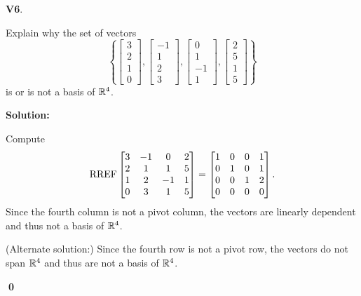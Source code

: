 \documentclass{article}
\newenvironment{problem}[1]
{
  \begin{flushleft}
  \textbf{#1}.
  \ignorespaces
}
{
  \end{flushleft}
}
\newenvironment{solution}
{
  \ignorespaces
  \textbf{Solution:}
}
{
  \ignorespacesafterend
  \begin{flushright}
  {\bfseries \qed}
  \end{flushright}
}
\begin{document}
\begin{problem}{V6}
Explain why the set of vectors \[ \left\{
 \begin{bmatrix} 3 \\ 2 \\ 1 \\ 0 \end{bmatrix} ,
 \begin{bmatrix} -1 \\ 1 \\ 2 \\ 3 \end{bmatrix} ,
 \begin{bmatrix} 0 \\ 1 \\ -1 \\ 1 \end{bmatrix} ,
 \begin{bmatrix} 2 \\ 5 \\ 1 \\ 5 \end{bmatrix} \right\} \]
is or is not a basis of \(\mathbb{R}^4\).
\end{problem}
\begin{solution}
Compute
\[\operatorname{RREF} \begin{bmatrix} 3 & -1 & 0 & 2 \\ 2 & 1 & 1 & 5 \\ 1 & 2 & -1 & 1 \\ 0 & 3 & 1 & 5 \end{bmatrix} =
\begin{bmatrix} 1 & 0 & 0 & 1 \\ 0 & 1 & 0 & 1 \\ 0 & 0 & 1 & 2 \\ 0 & 0 & 0 & 0 \end{bmatrix}.\]
Since the fourth column is not a pivot column, the vectors are linearly
dependent and thus not a basis of \(\mathbb{R}^4\).

(Alternate solution:)
Since the fourth row is not a pivot row, the vectors do not span
\(\mathbb{R}^4\) and thus are not a basis of \(\mathbb{R}^4\).
\end{solution}
\end{document}
